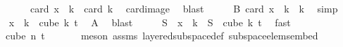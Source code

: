 \begin{isabellebody}
\ \ \isamarkupfalse%
\isanewline
\ \ \isamarkupfalse%
\ \isamarkupfalse%
\ {\isachardoublequoteopen}card\ {\isacharparenleft}{\kern0pt}x\ {\isacharbackquote}{\kern0pt}\ {\isacharbraceleft}{\kern0pt}{\isachardot}{\kern0pt}{\isachardot}{\kern0pt}k{\isacharbraceright}{\kern0pt}{\isacharparenright}{\kern0pt}\ {\isacharequal}{\kern0pt}\ card\ {\isacharbraceleft}{\kern0pt}{\isachardot}{\kern0pt}{\isachardot}{\kern0pt}k{\isacharbraceright}{\kern0pt}{\isachardoublequoteclose}\ \isamarkupfalse%
\ card{\isacharunderscore}{\kern0pt}image\ \isamarkupfalse%
\ blast\isanewline
\ \ \isamarkupfalse%
\ \isamarkupfalse%
\ B{\isacharcolon}{\kern0pt}\ {\isachardoublequoteopen}card\ {\isacharparenleft}{\kern0pt}x\ {\isacharbackquote}{\kern0pt}\ {\isacharbraceleft}{\kern0pt}{\isachardot}{\kern0pt}{\isachardot}{\kern0pt}k{\isacharbraceright}{\kern0pt}{\isacharparenright}{\kern0pt}\ {\isacharequal}{\kern0pt}\ k{\isacharplus}{\kern0pt}{}{\isachardoublequoteclose}\ \isamarkupfalse%
\ simp\isanewline
\ \ \isamarkupfalse%
\ {\isachardoublequoteopen}x\ {\isacharbackquote}{\kern0pt}\ {\isacharbraceleft}{\kern0pt}{\isachardot}{\kern0pt}{\isachardot}{\kern0pt}k{\isacharbraceright}{\kern0pt}\ {\isasymsubseteq}\ cube\ k\ {\isacharparenleft}{\kern0pt}t{\isacharplus}{\kern0pt}{}{\isacharparenright}{\kern0pt}{\isachardoublequoteclose}\ \isamarkupfalse%
\ A\ \isamarkupfalse%
\ blast\isanewline
\ \ \isamarkupfalse%
\ \isamarkupfalse%
\ {\isachardoublequoteopen}S\ {\isacharbackquote}{\kern0pt}\ x\ {\isacharbackquote}{\kern0pt}\ {\isacharbraceleft}{\kern0pt}{\isachardot}{\kern0pt}{\isachardot}{\kern0pt}k{\isacharbraceright}{\kern0pt}\ {\isasymsubseteq}\ S\ {\isacharbackquote}{\kern0pt}\ cube\ k\ {\isacharparenleft}{\kern0pt}t{\isacharplus}{\kern0pt}{}{\isacharparenright}{\kern0pt}{\isachardoublequoteclose}\ \isamarkupfalse%
\ fast\isanewline
\ \ \isamarkupfalse%
\ \isamarkupfalse%
\ {\isachardoublequoteopen}{\isachardot}{\kern0pt}{\isachardot}{\kern0pt}{\isachardot}{\kern0pt}\ {\isasymsubseteq}\ cube\ n\ {\isacharparenleft}{\kern0pt}t{\isacharplus}{\kern0pt}{}{\isacharparenright}{\kern0pt}{\isachardoublequoteclose}\ \isanewline
\ \ \ \ \isamarkupfalse%
\ {\isacharparenleft}{\kern0pt}meson\ assms{\isacharparenleft}{\kern0pt}{}{\isacharparenright}{\kern0pt}\ layered{\isacharunderscore}{\kern0pt}subspace{\isacharunderscore}{\kern0pt}def\ subspace{\isacharunderscore}{\kern0pt}elems{\isacharunderscore}{\kern0pt}embed{\isacharparenright}{\kern0pt}\isanewline

\end{isabellebody}
